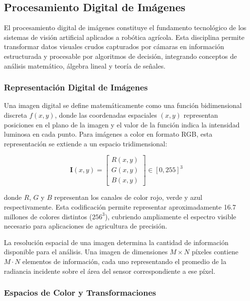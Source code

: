 \subsection{Procesamiento Digital de Imágenes}

El procesamiento digital de imágenes constituye el fundamento tecnológico de los sistemas de visión artificial aplicados a robótica agrícola. Esta disciplina permite transformar datos visuales crudos capturados por cámaras en información estructurada y procesable por algoritmos de decisión, integrando conceptos de análisis matemático, álgebra lineal y teoría de señales.

\subsubsection{Representación Digital de Imágenes}

Una imagen digital se define matemáticamente como una función bidimensional discreta $f(x,y)$, donde las coordenadas espaciales $(x,y)$ representan posiciones en el plano de la imagen y el valor de la función indica la intensidad luminosa en cada punto. Para imágenes a color en formato RGB, esta representación se extiende a un espacio tridimensional:

\begin{equation}
\mathbf{I}(x,y) = \begin{bmatrix} R(x,y) \\ G(x,y) \\ B(x,y) \end{bmatrix} \in [0, 255]^3
\end{equation}

donde $R$, $G$ y $B$ representan los canales de color rojo, verde y azul respectivamente. Esta codificación permite representar aproximadamente 16.7 millones de colores distintos ($256^3$), cubriendo ampliamente el espectro visible necesario para aplicaciones de agricultura de precisión.

La resolución espacial de una imagen determina la cantidad de información disponible para el análisis. Una imagen de dimensiones $M \times N$ píxeles contiene $M \cdot N$ elementos de información, cada uno representando el promedio de la radiancia incidente sobre el área del sensor correspondiente a ese píxel.

\subsubsection{Espacios de Color y Transformaciones}

